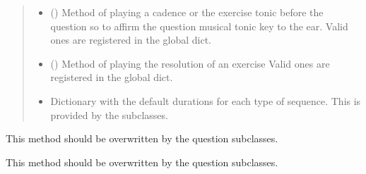 \documentclass[letterpaper,10pt,english]{sphinxmanual}
\begin{document}
\begin{fulllineitems}
\begin{fulllineitems}
\begin{quote}
\begin{description}
\begin{itemize}
\item {} 
 () \textendash{} Method of playing a cadence or the
exercise tonic before the question so to affirm the question
musical tonic key to the ear. Valid ones are registered in the
 global dict.

\item {} 
 () \textendash{} Method of playing the resolution of an
exercise Valid ones are registered in the
 global dict.

\item {} 
 \textendash{} Dictionary with the default durations for
each type of sequence. This is provided by the subclasses.

\end{itemize}

\end{description}\end{quote}

\end{fulllineitems}


\begin{fulllineitems}
\label{\detokenize{birdears:birdears.questionbase.QuestionBase.check_question}}
This method should be overwritten by the question subclasses.

\end{fulllineitems}


\begin{fulllineitems}
\label{\detokenize{birdears:birdears.questionbase.QuestionBase.make_question}}
This method should be overwritten by the question subclasses.

\end{fulllineitems}


\end{fulllineitems}
\end{document}
